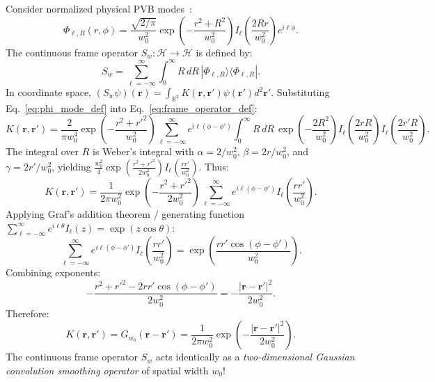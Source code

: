 \documentclass[11pt,a4paper]{article}
\begin{document}
Consider normalized physical PVB modes~\cite{Ferreira2026}:
\begin{equation}
\Phi_{\ell, R}(r, \phi) = \frac{\sqrt{2/\pi}}{w_0^2} \exp\left( - \frac{r^2 + R^2}{w_0^2} \right) I_\ell\left( \frac{2 R r}{w_0^2} \right) e^{i \ell \phi}.
\label{eq:phi_mode_def}
\end{equation}
The continuous frame operator $S_w: \mathcal{H} \to \mathcal{H}$ is defined by:
\begin{equation}
S_w = \sum_{\ell=-\infty}^\infty \int_0^\infty R \, dR \, |\Phi_{\ell, R}\rangle \langle \Phi_{\ell, R}|.
\label{eq:frame_operator_def}
\end{equation}
In coordinate space, $(S_w \psi)(\mathbf{r}) = \int_{\mathbb{R}^2} K(\mathbf{r}, \mathbf{r}') \psi(\mathbf{r}') d^2\mathbf{r}'$. Substituting Eq.~\eqref{eq:phi_mode_def} into Eq.~\eqref{eq:frame_operator_def}:
\begin{equation}
K(\mathbf{r}, \mathbf{r}') = \frac{2}{\pi w_0^4} \exp\left( - \frac{r^2 + r'^2}{w_0^2} \right) \sum_{\ell=-\infty}^\infty e^{i \ell(\phi - \phi')} \int_0^\infty R \, dR \, \exp\left( - \frac{2 R^2}{w_0^2} \right) I_\ell\left( \frac{2 r R}{w_0^2} \right) I_\ell\left( \frac{2 r' R}{w_0^2} \right).
\label{eq:kernel_integral_setup}
\end{equation}
The integral over $R$ is Weber's integral with $\alpha = 2/w_0^2$, $\beta = 2r/w_0^2$, and $\gamma = 2r'/w_0^2$, yielding $\frac{w_0^2}{4} \exp(\frac{r^2 + r'^2}{2w_0^2}) I_\ell(\frac{r r'}{w_0^2})$. Thus:
\begin{equation}
K(\mathbf{r}, \mathbf{r}') = \frac{1}{2\pi w_0^2} \exp\left( - \frac{r^2 + r'^2}{2 w_0^2} \right) \sum_{\ell=-\infty}^\infty e^{i \ell(\phi - \phi')} I_\ell\left( \frac{r r'}{w_0^2} \right).
\label{eq:kernel_after_weber}
\end{equation}
Applying Graf's addition theorem / generating function $\sum_{\ell=-\infty}^\infty e^{i \ell \theta} I_\ell(z) = \exp(z \cos \theta)$:
\begin{equation}
\sum_{\ell=-\infty}^\infty e^{i \ell(\phi - \phi')} I_\ell\left( \frac{r r'}{w_0^2} \right) = \exp\left( \frac{r r' \cos(\phi - \phi')}{w_0^2} \right).
\label{eq:graf_application}
\end{equation}
Combining exponents:
\begin{equation}
- \frac{r^2 + r'^2 - 2 r r' \cos(\phi - \phi')}{2 w_0^2} = - \frac{|\mathbf{r} - \mathbf{r}'|^2}{2 w_0^2}.
\label{eq:coordinate_difference}
\end{equation}
Therefore:
\begin{equation}
\boxed{K(\mathbf{r}, \mathbf{r}') = G_{w_0}(\mathbf{r} - \mathbf{r}') = \frac{1}{2\pi w_0^2} \exp\left( - \frac{|\mathbf{r} - \mathbf{r}'|^2}{2 w_0^2} \right).}
\label{eq:gaussian_kernel}
\end{equation}
The continuous frame operator $S_w$ acts identically as a \emph{two-dimensional Gaussian convolution smoothing operator} of spatial width $w_0$!
\end{document}
